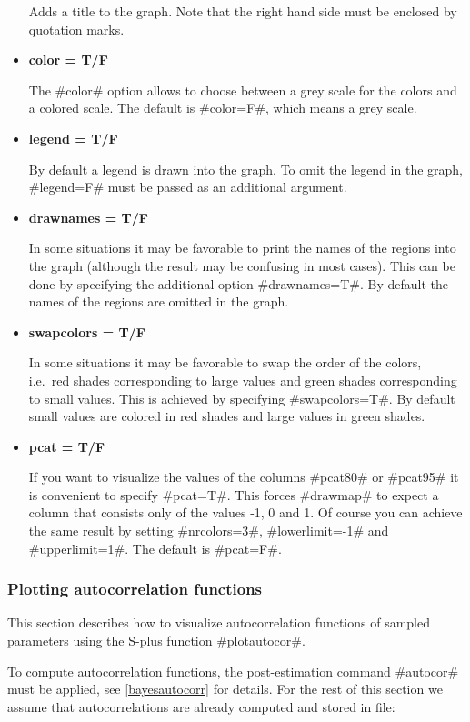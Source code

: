 \begin{itemize}
Adds a title to the graph. Note that the right hand side must be
enclosed by quotation marks.
\item {\bf color = T/F}

The #color# option allows to choose between a grey scale for the
colors and a colored scale. The default is #color=F#, which means
a grey scale.
\item {\bf legend = T/F}

By default a legend is drawn into the graph. To omit the legend in
the graph, #legend=F# must be passed as an additional argument.
\item {\bf drawnames = T/F}

In some situations it may be favorable to print the names of the
regions into the graph (although the result may be confusing in
most cases). This can be done by specifying the additional option
#drawnames=T#. By default the names of the regions are omitted in
the graph.
\item {\bf swapcolors = T/F}

In some situations it may be favorable to swap the order of the
colors, i.e.~red shades corresponding to large values and green
shades corresponding to small values. This is achieved by
specifying #swapcolors=T#. By default small values are colored in
red shades and large values in green shades.
\item {\bf pcat = T/F}

If you want to visualize the values of the columns #pcat80# or
#pcat95# it is convenient to specify #pcat=T#. This forces
#drawmap# to expect a column that consists only of the values -1,
0 and 1. Of course you can achieve the same result by setting
#nrcolors=3#, #lowerlimit=-1# and #upperlimit=1#. The default is
#pcat=F#.
\end{itemize}


\subsubsection{Plotting autocorrelation functions}
\label{splusplotautocor}  

This section describes how to visualize autocorrelation functions
of sampled parameters using the S-plus function #plotautocor#.

To compute autocorrelation functions, the post-estimation command
#autocor# must be applied, see \autoref{bayesautocorr} for
details. For the rest of this section we assume that
autocorrelations are already computed and stored in file:

